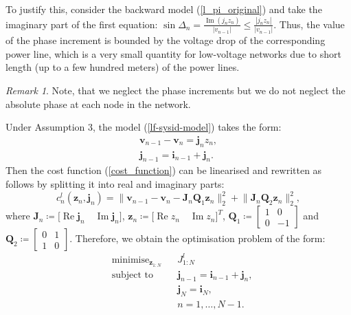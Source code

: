 \documentclass[journal,10pt,onecolumn,draftclsnofoot,]{IEEEtran}
\theoremstyle{plain}
\theoremstyle{definition}
\theoremstyle{remark}
\newtheorem*{remark}{Remark}
\DeclareMathOperator{\minimise}{minimise}
\DeclareMathOperator{\st}{subject ~ to}
\DeclareMathOperator{\Real}{Re}
\DeclareMathOperator{\Imag}{Im}
\begin{document}
To justify this, consider the backward model (\ref{l_pi_original}) and take the imaginary part of the first equation: 
$\sin{\Delta_{n}} = \frac{\Imag{(j_{n}z_{n})}}{|v_{n-1}|} \le \frac{|j_{n}z_{n}|}{|v_{n-1}|}.$
Thus, the value of the phase increment is bounded by the voltage drop of the corresponding power line, which is a very small quantity for low-voltage networks due to short length (up to a few hundred meters) of the power lines.
\begin{remark}
Note, that we neglect the phase increments but we do not neglect the absolute phase at each node in the network. 
\end{remark}
Under Assumption 3, the model (\ref{lf-sysid-model}) takes the form:
\begin{equation}
  \begin{split}
  \bm{v}_{n-1} - \bm{v}_{n} = \bm{j}_{n}z_{n}, \\
  \bm{j}_{n-1} = \bm{i}_{n-1} + \bm{j}_{n}.
  \end{split}
  \label{lf-sysid-model-lin}
\end{equation}
Then the cost function (\ref{cost_function}) can be linearised and rewritten as follows by splitting it into real and imaginary parts:
\begin{equation}
  c^{l}_n(\bm{z}_{n}, \bm{j}_n) = \Big\| \bm{v}_{n-1} - \bm{v}_{n} - \bm{J}_{n}\bm{Q}_1\bm{z}_{n} \Big\|_2^2 + \Big\|\bm{J}_{n}\bm{Q}_2\bm{z}_{n} \Big\|_2^2,
  \label{cost_function-lin}
\end{equation}
where $\bm{J}_n \coloneqq \big[ \Real{\bm{j}_n} \quad \Imag{\bm{j}_n}\big]$, $\bm{z}_n \coloneqq \big[ \Real{z_n} \quad \Imag{z_n} \big]^T$, $\bm{Q}_1 \coloneqq 
\begin{bmatrix}
1 & 0 \\
0 & -1
\end{bmatrix}$ and $\bm{Q}_2 \coloneqq
\begin{bmatrix}
0 & 1 \\
1 & 0
\end{bmatrix}$.
Therefore, we obtain the optimisation problem of the form:
\begin{equation}
  \begin{aligned}
  & \minimise_{\bm{z}_{1:N}} 
  & & J^l_{1:N} \\
  & \st
  & & \bm{j}_{n-1} = \bm{i}_{n-1} + \bm{j}_{n}, \\
  &&& \bm{j}_{N} = \bm{i}_{N}, \\
  &&& n = 1,\ldots, N-1.
  \end{aligned}
  \label{lf-sysid-problem-lin}
\end{equation}
\end{document}
